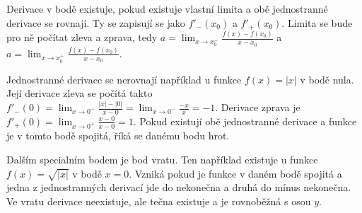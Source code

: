 \documentclass[12pt]{article}
\begin{document}
\begin{center}
\end{center}
Derivace v bodě existuje, pokud existuje vlastní limita a obě jednostranné derivace se rovnají.
Ty se zapisují se jako  $f'_-(x_0)$ a $f'_+(x_0)$. Limita se bude pro ně počítat zleva a zprava, tedy
$a = \lim_{x \to x_0^-} \frac{f(x) - f(x_0)}{x - x_0}$ a $a = \lim_{x \to x_0^+} \frac{f(x) - f(x_0)}
{x - x_0}$. 

Jednostranné derivace se nerovnají například u funkce $f(x) = |x|$ v bodě nula. Její derivace zleva se
počítá takto $f'_-(0) = \lim_{x \to 0^-} \frac{|x| - |0|}{x - 0} = \lim_{x \to 0^-} \frac{-x}{x} =
-1$. Derivace zprava je $f'_+(0) = \lim_{x \to 0^+} \frac{x - 0}{x - 0} = 1$. Pokud existují obě
jednostranné derivace a funkce je v tomto bodě spojitá, říká se danému bodu hrot.

Dalším specialním bodem je bod vratu. Ten například existuje u funkce $f(x) = \sqrt{|x|}$ v bodě
$x = 0$.
Vzniká pokud je funkce v daném bodě spojitá a jedna z jednostranných derivací jde do nekonečna a
druhá do mínus nekonečna. Ve vratu derivace neexistuje, ale tečna existuje a je rovnoběžná s osou $y$.
\end{document}
